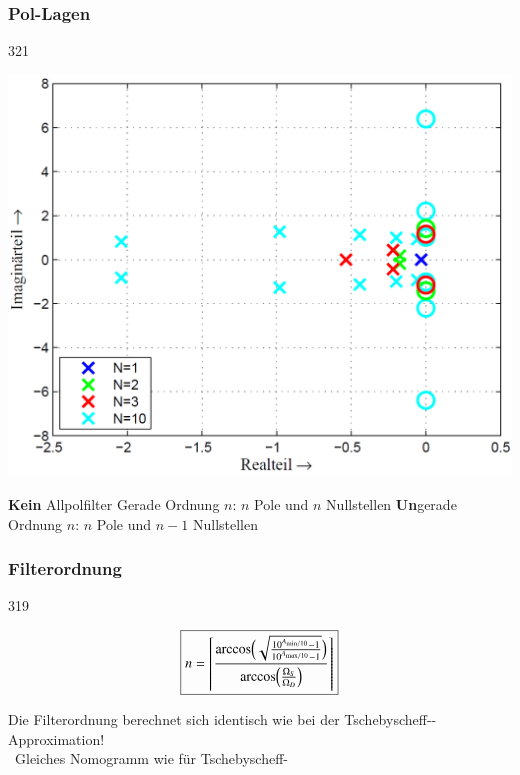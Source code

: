 \subsubsection{Pol-Lagen}{321}

\begin{minipage}[c]{0.4\columnwidth}
    \includegraphics[width=\columnwidth]{images/filter_tschebyscheff_invers_pollage.png}
\end{minipage}
\hfill
\begin{minipage}[c]{0.58\columnwidth}
    \begin{outline}
        \1 \textbf{Kein} Allpolfilter
            \2 Gerade Ordnung $n$: $n$ Pole und $n$ Nullstellen
            \2 \textbf{Un}gerade Ordnung $n$: $n$ Pole und $n-1$ Nullstellen
    \end{outline}
\end{minipage}


\subsubsection{Filterordnung}{319}

\begin{minipage}[c]{0.4\columnwidth}
    $$ \boxed{ n =  \left\lceil \frac{\arccos \Bigl( \sqrt{ \frac{10^{A_{\rm min / 10}} - 1}{10^{A_{\rm max / 10}} - 1} } \Bigr) }
    {\arccos \Bigl( \frac{\Omega_S}{\Omega_D} \Bigr)}  \right\rceil } $$
\end{minipage}
\hfill
\begin{minipage}[c]{0.58\columnwidth}
    Die Filterordnung berechnet sich identisch wie bei der Tschebyscheff--Approximation! \\
    \textrightarrow\ Gleiches Nomogramm wie für Tschebyscheff-
\end{minipage}


